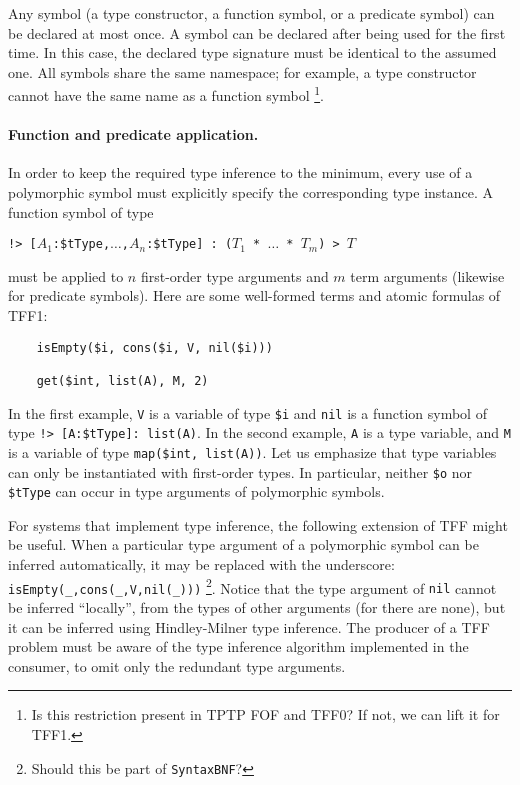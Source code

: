 Any symbol (a type constructor, a function symbol, or a predicate symbol)
can be declared at most once. A symbol can be declared after being used
for the first time. In this case, the declared type signature must be
identical to the assumed one. All symbols share the same namespace; for
example, a type constructor cannot have the same name as a function symbol%
\footnote{Is this restriction present in TPTP FOF and TFF0? If not, we can
lift it for TFF1.}.

\paragraph{Function and predicate application.} In order to keep
the required type inference to the minimum, every use of a polymorphic
symbol must explicitly specify the corresponding type instance.
A function symbol of type
\begin{center}
{\tt !>~[$A_1$:\$tType,$\dots$,$A_n$:\$tType]~:~($T_1$ * $\dots$ * $T_m$)
> $T$}
\end{center}
must be applied to $n$ first-order type arguments and $m$ term arguments
(likewise for predicate symbols). Here are some well-formed
terms and atomic formulas of TFF1:
\begin{verbatim}
    isEmpty($i, cons($i, V, nil($i)))

    get($int, list(A), M, 2)
\end{verbatim}
In the first example, {\tt V} is a variable of type {\tt \$i}
and {\tt nil} is a function
symbol of type {\tt !>~[A:\$tType]: list(A)}. In the second
example, {\tt A} is a type variable, and {\tt M} is a variable
of type {\tt map(\$int, list(A))}. Let us emphasize that type
variables can only be instantiated with first-order types.
In particular, neither \verb+$o+ nor \verb+$tType+ can occur
in type arguments of polymorphic symbols.

For systems that implement type inference, the following extension
of TFF might be useful. When a particular type argument of
a polymorphic symbol can be inferred automatically, it may be
replaced with the underscore: \verb+isEmpty(_,cons(_,V,nil(_)))+%
\footnote{Should this be part of {\tt SyntaxBNF}?}.
Notice that the type argument of {\tt nil} cannot be inferred
``locally'', from the types of other arguments (for there are none),
but it can be inferred using Hindley-Milner type inference.
The producer of a TFF problem must be aware of the type
inference algorithm implemented in the consumer, to omit
only the redundant type arguments.

